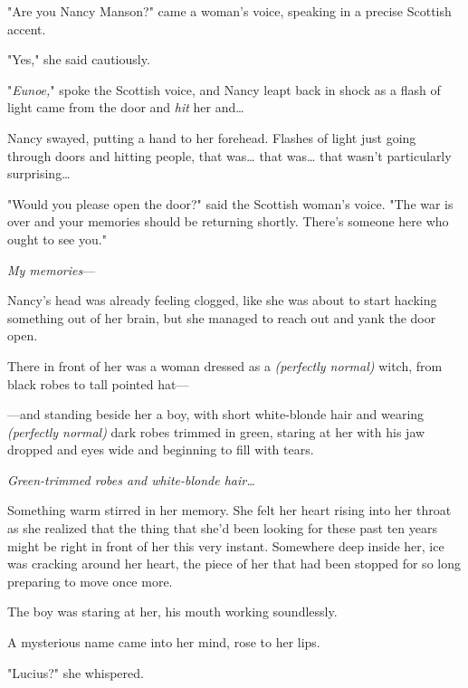 "Are you Nancy Manson?" came a woman's voice, speaking in a precise Scottish
accent.

"Yes," she said cautiously.

"\emph{Eunoe,}" spoke the Scottish voice, and Nancy leapt back in shock as a
flash of light came from the door and \emph{hit} her and{\ldots}

Nancy swayed, putting a hand to her forehead. Flashes of light just going
through doors and hitting people, that was{\ldots} that was{\ldots} that wasn't
particularly surprising{\ldots}

"Would you please open the door?" said the Scottish woman's voice. "The war is
over and your memories should be returning shortly. There's someone here who
ought to see you."

\emph{My memories}---

Nancy's head was already feeling clogged, like she was about to start hacking
something out of her brain, but she managed to reach out and yank the door open.

There in front of her was a woman dressed as a \emph{(perfectly normal)} witch,
from black robes to tall pointed hat---

---and standing beside her a boy, with short white-blonde hair and wearing
\emph{(perfectly normal)} dark robes trimmed in green, staring at her with his
jaw dropped and eyes wide and beginning to fill with tears.

\emph{Green-trimmed robes and white-blonde hair{\ldots}}

Something warm stirred in her memory. She felt her heart rising into her throat
as she realized that the thing that she'd been looking for these past ten years
might be right in front of her this very instant. Somewhere deep inside her,
ice was cracking around her heart, the piece of her that had been stopped for
so long preparing to move once more.

The boy was staring at her, his mouth working soundlessly.

A mysterious name came into her mind, rose to her lips.

"Lucius?" she whispered.
